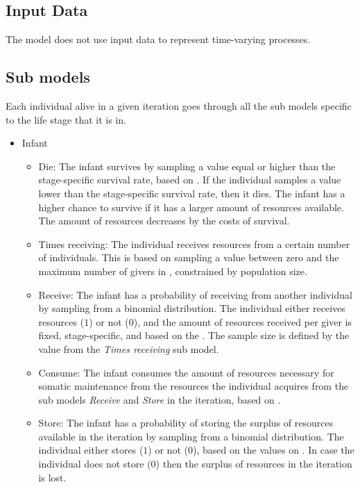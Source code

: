 \documentclass{article}
\begin{document}
\subsection{Input Data}

The model does not use input data to represent time-varying processes.

\subsection{Sub models}

Each individual alive in a given iteration goes through all the sub models specific to the life stage that it is in.

\begin{itemize}
    \item Infant
    \begin{itemize}
        \item Die: The infant survives by sampling a value equal or higher than the stage-specific survival rate, based on \cite{gurven2007longevity}. If the individual samples a value lower than the stage-specific survival rate, then it dies. The infant has a higher chance to survive if it has a larger amount of resources available. The amount of resources decreases by the costs of survival.
        \item Times receiving: The individual receives resources from a certain number of individuals. This is based on sampling a value between zero and the maximum number of givers in \cite{gurven2004give}, constrained by population size.
        \item Receive: The infant has a probability of receiving from another individual by sampling from a binomial distribution. The individual either receives resources ($1$) or not ($0$), and the amount of resources received per giver is fixed, stage-specific, and based on the \cite{gurven2004give}. The sample size is defined by the value from the \emph{Times receiving} sub model. 
        \item Consume: The infant consumes the amount of resources necessary for somatic maintenance from the resources the individual acquires from the sub models  \emph{Receive} and \emph{Store} in the iteration, based on \cite{kaplan2000theory, pontzer2021daily}.
        \item Store: The infant has a probability of storing the surplus of resources available in the iteration by sampling from a binomial distribution. The individual either stores ($1$) or not ($0$), based on the values on \citep{bowles2011cultivation}. In case the individual does not store ($0$) then the surplus  of resources in the iteration is lost.

\end{itemize}
\end{itemize}
\end{document}
